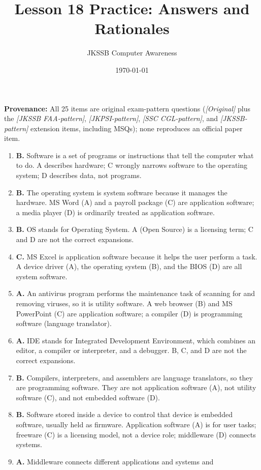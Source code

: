 \documentclass[11pt]{article}
\title{Lesson 18 Practice: Answers and Rationales}
\author{JKSSB Computer Awareness}
\date{\today}
\begin{document}
\maketitle
\noindent\textbf{Provenance:} All 25 items are original exam-pattern questions (\textit{[Original]} plus the \textit{[JKSSB FAA-pattern]}, \textit{[JKPSI-pattern]}, \textit{[SSC CGL-pattern]}, and \textit{[JKSSB-pattern]} extension items, including MSQs); none reproduces an official paper item.
\begin{enumerate}[label=\textbf{Q\arabic*.}, leftmargin=*]
\item \textbf{B.} Software is a set of programs or instructions that tell the
  computer what to do. A describes hardware; C wrongly narrows software to the
  operating system; D describes data, not programs.
\item \textbf{B.} The operating system is system software because it manages
  the hardware. MS Word (A) and a payroll package (C) are application
  software; a media player (D) is ordinarily treated as application software.
\item \textbf{B.} OS stands for Operating System. A (Open Source) is a
  licensing term; C and D are not the correct expansions.
\item \textbf{C.} MS Excel is application software because it helps the user
  perform a task. A device driver (A), the operating system (B), and the BIOS
  (D) are all system software.
\item \textbf{A.} An antivirus program performs the maintenance task of
  scanning for and removing viruses, so it is utility software. A web browser
  (B) and MS PowerPoint (C) are application software; a compiler (D) is
  programming software (language translator).
\item \textbf{A.} IDE stands for Integrated Development Environment, which
  combines an editor, a compiler or interpreter, and a debugger. B, C, and D
  are not the correct expansions.
\item \textbf{B.} Compilers, interpreters, and assemblers are language
  translators, so they are programming software. They are not application
  software (A), not utility software (C), and not embedded software (D).
\item \textbf{B.} Software stored inside a device to control that device is
  embedded software, usually held as firmware. Application software (A) is
  for user tasks; freeware (C) is a licensing model, not a device role;
  middleware (D) connects systems.
\item \textbf{A.} Middleware connects different applications and systems and

\end{enumerate}
\end{document}
